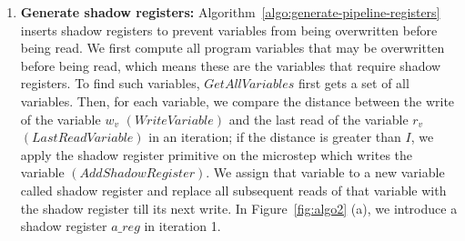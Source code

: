 \begin{enumerate}
\item {\bf Generate shadow registers:} Algorithm~\ref{algo:generate-pipeline-registers} inserts shadow registers to prevent variables from being overwritten before being read. We first compute all program variables that may be overwritten before being read, which means these are the variables that require shadow registers. To find such variables, $GetAllVariables$ first gets a set of all variables. Then, for each variable, we compare the distance between the write of the variable $w_v$ $(WriteVariable)$ and the last read of the variable $r_v$ $(LastReadVariable)$ in an iteration; if the distance is greater than $I$, %
we apply the shadow register primitive on the microstep which writes the variable $(AddShadowRegister)$. We assign that variable to a new variable called shadow register and replace all subsequent reads of that variable with the shadow register till its next write. In Figure~\ref{fig:algo2} (a), we introduce a shadow register $a\_reg$ in iteration 1.
   

\end{enumerate}
